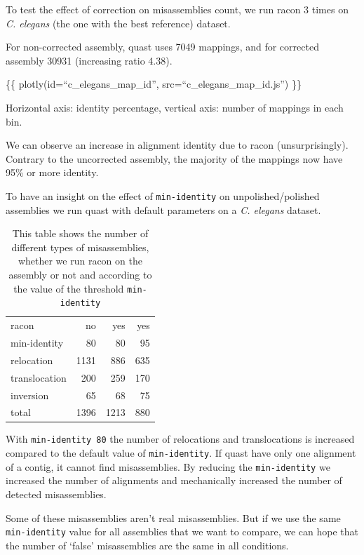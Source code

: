 \documentclass[./main.tex]{subfiles}
\begin{document}
To test the effect of correction on misassemblies count, we run racon 3
times on \emph{C. elegans} (the one with the best reference) dataset.

For non-corrected assembly, quast uses 7049 mappings, and for corrected
assembly 30931 (increasing ratio 4.38).

\{\{ plotly(id=``c\_elegans\_map\_id'', src=``c\_elegans\_map\_id.js'')
\}\}

Horizontal axis: identity percentage, vertical axis: number of mappings
in each bin.

We can observe an increase in alignment identity due to racon
(unsurprisingly). Contrary to the uncorrected assembly, the majority of
the mappings now have 95\% or more identity.

To have an insight on the effect of \texttt{min-identity} on
unpolished/polished assemblies we run quast with default parameters on a
\emph{C. elegans} dataset.

\begin{table}[]
    \centering
        \begin{tabular}{lrrr}
            \hline
            racon & no & yes & yes \\
            min-identity & 80 & 80 & 95 \\ \hline
            relocation & 1131 & 886 & 635 \\
            translocation & 200 & 259 & 170 \\
            inversion & 65 & 68 & 75 \\
            total & 1396 & 1213 & 880 \\
            \hline
        \end{tabular}
    \caption{This table shows the number of different types of misassemblies, whether we run racon on the assembly or not and according to the value of the threshold \texttt{min-identity}}
    \label{tab:my_label}
\end{table}


With \texttt{min-identity\ 80} the number of relocations and
translocations is increased compared to the default value of
\texttt{min-identity}. If quast have only one alignment of a contig, it
cannot find misassemblies. By reducing the \texttt{min-identity} we
increased the number of alignments and mechanically increased the number
of detected misassemblies.

Some of these misassemblies aren't real misassemblies. But if we use the
same \texttt{min-identity} value for all assemblies that we want to
compare, we can hope that the number of `false' misassemblies are the
same in all conditions.
\end{document}
